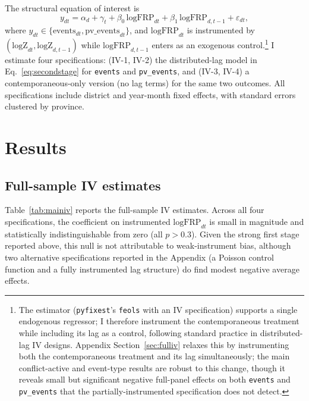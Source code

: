 \documentclass[12pt]{article}
\begin{document}
The structural equation of interest is
\begin{equation}
y_{dt} = \alpha_d + \gamma_t + \beta_0\, \text{logFRP}_{dt} + \beta_1\, \text{logFRP}_{d,t-1} + \varepsilon_{dt},
\label{eq:secondstage}
\end{equation}
where $y_{dt} \in \{\text{events}_{dt}, \text{pv\_events}_{dt}\}$, and $\text{logFRP}_{dt}$ is instrumented by $(\text{logZ}_{dt}, \text{logZ}_{d,t-1})$ while $\text{logFRP}_{d,t-1}$ enters as an exogenous control.\footnote{The estimator (\texttt{pyfixest}'s \texttt{feols} with an IV specification) supports a single endogenous regressor; I therefore instrument the contemporaneous treatment while including its lag as a control, following standard practice in distributed-lag IV designs. Appendix Section~\ref{sec:fulliv} relaxes this by instrumenting both the contemporaneous treatment and its lag simultaneously; the main conflict-active and event-type results are robust to this change, though it reveals small but significant negative full-panel effects on both \texttt{events} and \texttt{pv\_events} that the partially-instrumented specification does not detect.} I estimate four specifications: (IV-1, IV-2) the distributed-lag model in Eq.~\eqref{eq:secondstage} for \texttt{events} and \texttt{pv\_events}, and (IV-3, IV-4) a contemporaneous-only version (no lag terms) for the same two outcomes. All specifications include district and year-month fixed effects, with standard errors clustered by province.

\section{Results}
\label{sec:results}

\subsection{Full-sample IV estimates}

Table~\ref{tab:mainiv} reports the full-sample IV estimates. Across all four specifications, the coefficient on instrumented $\text{logFRP}_{dt}$ is small in magnitude and statistically indistinguishable from zero (all $p>0.3$). Given the strong first stage reported above, this null is not attributable to weak-instrument bias, although two alternative specifications reported in the Appendix (a Poisson control function and a fully instrumented lag structure) do find modest negative average effects.
\end{document}
